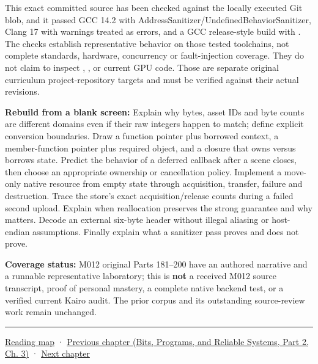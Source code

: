 This exact committed source has been checked against the locally executed Git blob, and it passed GCC 14.2 with AddressSanitizer/UndefinedBehaviorSanitizer, Clang 17 with warnings treated as errors, and a GCC release-style build with . The checks establish representative behavior on those tested toolchains, not complete standards, hardware, concurrency or fault-injection coverage. They do not claim to inspect , , or current GPU code. Those are separate original curriculum project-repository targets and must be verified against their actual revisions.

\textbf{Rebuild from a blank screen:} Explain why bytes, asset IDs and byte counts are different domains even if their raw integers happen to match; define explicit conversion boundaries. Draw a function pointer plus borrowed context, a member-function pointer plus required object, and a closure that owns versus borrows state. Predict the behavior of a deferred callback after a scene closes, then choose an appropriate ownership or cancellation policy. Implement a move-only native resource from empty state through acquisition, transfer, failure and destruction. Trace the store's exact acquisition/release counts during a failed second upload. Explain when  reallocation preserves the strong guarantee and why  matters. Decode an external six-byte header without illegal aliasing or host-endian assumptions. Finally explain what a sanitizer pass proves and does not prove.

\textbf{Coverage status:} M012 original Parts 181--200 have an authored narrative and a runnable representative laboratory; this is \textbf{not} a received M012 source transcript, proof of personal mastery, a complete native backend test, or a verified current Kairo audit. The prior corpus and its outstanding source-review work remain unchanged.

\begin{center}\rule{0.5\linewidth}{0.5pt}\end{center}

\hyperref[volume-reading-map]{Reading map} · \href{../01-Bits-Programs-and-Reliable-Systems-P02/main.pdf\#nameddest=01-foundations-i-ch003-records-as-resource-transactions}{Previous chapter (Bits, Programs, and Reliable Systems, Part 2, Ch. 3)} · \hyperref[01-foundations-i-ch005-generic-asset-pipelines-without-hidden-contracts]{Next chapter}

